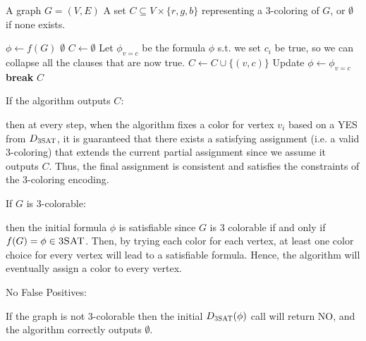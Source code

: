 \documentclass[12pt, letterpaper]{article}
\begin{document}
\begin{problemproof}
    \begin{algorithm}[H]
        \caption{Find3Coloring($G=(V,E)$)}
        \begin{algorithmic}[1]
            \Require A graph $G=(V,E)$
            \Ensure A set $C \subseteq V \times \{r,g,b\}$ representing a 3-coloring of $G$, or $\emptyset$ if none exists.
            
            \State $\phi \gets f(G)$ 
                \State \Return $\emptyset$
            \EndIf
            \State $C \gets \emptyset$ 
                    \State Let $\phi_{v=c}$ be the formula $\phi$ s.t. we set $c_i$ be true, so we can collapse all the clauses that are now true.
                        \State $C \gets C \cup \{(v,c)\}$
                        \State Update $\phi \gets \phi_{v=c}$ 
                        \State \textbf{break} 
                    \EndIf
                \EndFor
            \EndFor
            \State \Return $C$
        \end{algorithmic}
        \end{algorithm}

    If the algorithm outputs $C$:

    then at every step, when the algorithm fixes a color for vertex $v_i$ based on a YES from $D_{\textsc{3SAT}}$, it is guaranteed that there exists a satisfying assignment (i.e. a valid 3-coloring) that extends the current partial assignment since we assume it outputs $C$. Thus, the final assignment is consistent and satisfies the constraints of the 3-coloring encoding.

    If $G$ is 3-colorable:

    then the initial formula $\phi$ is satisfiable since $G$ is 3 colorable if and only if $f(G)=\phi \in \textsc{3SAT}$. Then, by trying each color for each vertex, at least one color choice for every vertex will lead to a satisfiable formula. Hence, the algorithm will eventually assign a color to every vertex.

    No False Positives:

    If the graph is not 3-colorable then the initial $D_{\textsc{3SAT}}(\phi)$ call will return NO, and the algorithm correctly outputs $\emptyset$.


\end{problemproof}
\end{document}
